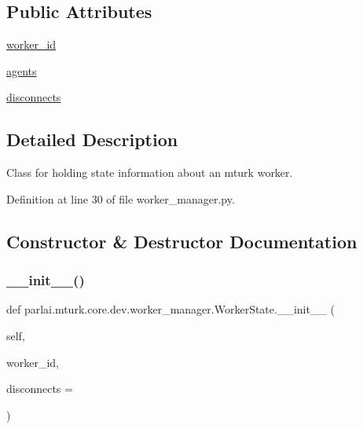\subsection*{Public Attributes}
\begin{DoxyCompactItemize}
\item 
\hyperlink{classparlai_1_1mturk_1_1core_1_1dev_1_1worker__manager_1_1WorkerState_aa4019a351d1a1e41bc7a8c26229b2772}{worker\+\_\+id}
\item 
\hyperlink{classparlai_1_1mturk_1_1core_1_1dev_1_1worker__manager_1_1WorkerState_ae267b0c320d73f92f96dd347bb9265cb}{agents}
\item 
\hyperlink{classparlai_1_1mturk_1_1core_1_1dev_1_1worker__manager_1_1WorkerState_aaf0e1e68c219df754da29d8188150796}{disconnects}
\end{DoxyCompactItemize}


\subsection{Detailed Description}
\begin{DoxyVerb}Class for holding state information about an mturk worker.
\end{DoxyVerb}
 

Definition at line 30 of file worker\+\_\+manager.\+py.



\subsection{Constructor \& Destructor Documentation}
\mbox{\label{classparlai_1_1mturk_1_1core_1_1dev_1_1worker__manager_1_1WorkerState_ad5b7c2eef6d44cb5856beb7f951bc76a}} 
\subsubsection{\texorpdfstring{\+\_\+\+\_\+init\+\_\+\+\_\+()}{\_\_init\_\_()}}
{\footnotesize\ttfamily def parlai.\+mturk.\+core.\+dev.\+worker\+\_\+manager.\+Worker\+State.\+\_\+\+\_\+init\+\_\+\+\_\+ (\begin{DoxyParamCaption}\item[{}]{self,  }\item[{}]{worker\+\_\+id,  }\item[{}]{disconnects = {} }\end{DoxyParamCaption})}

